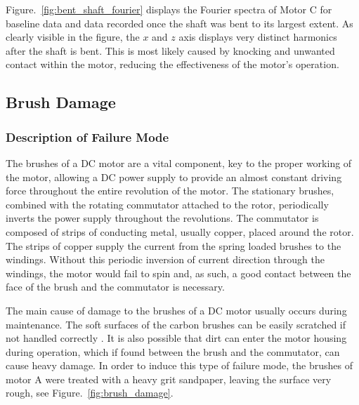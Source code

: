 Figure.~\ref{fig:bent_shaft_fourier} displays the Fourier spectra of Motor C for baseline data and data recorded once the shaft was bent to its largest extent. As clearly visible in the figure, the $x$ and $z$ axis displays very distinct harmonics after the shaft is bent. This is most likely caused by knocking and unwanted contact within the motor, reducing the effectiveness of the motor's operation.


\subsection{Brush Damage}

\subsubsection{Description of Failure Mode}
The brushes of a DC motor are a vital component, key to the proper working of the motor, allowing a DC power supply to provide an almost constant driving force throughout the entire revolution of the motor. The stationary brushes, combined with the rotating commutator attached to the rotor, periodically inverts the power supply throughout the revolutions. The commutator is composed of strips of conducting metal, usually copper, placed around the rotor. The strips of copper supply the current from the spring loaded brushes to the windings.  Without this periodic inversion of current direction through the windings, the motor would fail to spin and, as such, a good contact between the face of the brush and the commutator is necessary. 

The main cause of damage to the brushes of a DC motor usually occurs during maintenance. The soft surfaces of the carbon brushes can be easily scratched if not handled correctly \cite{hamilton2000dc}. It is also possible that dirt can enter the motor housing during operation, which if found between the brush and the commutator, can cause heavy damage. In order to induce this type of failure mode, the brushes of motor A were treated with a heavy grit sandpaper, leaving the surface very rough, see Figure.~\ref{fig:brush_damage}.

